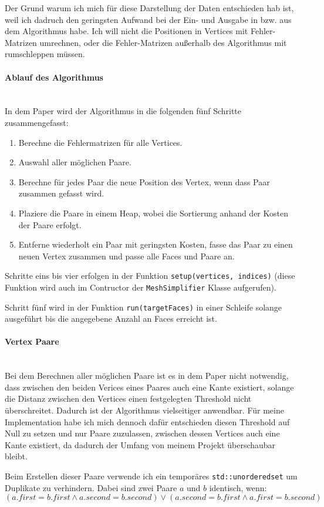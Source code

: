\documentclass[a4paper,12pt]{article}
\newcommand{\myparagraph}[1]{\paragraph*{#1}\mbox{}\\}
\begin{document}
Der Grund warum ich mich für diese Darstellung der Daten entschieden hab ist, weil ich dadruch den geringsten Aufwand bei der Ein- und Ausgabe in bzw. aus dem Algorithmus habe. 
Ich will nicht die Positionen in Vertices mit Fehler-Matrizen umrechnen, oder die Fehler-Matrizen außerhalb des Algorithmus mit rumschleppen müssen.

\myparagraph{Ablauf des Algorithmus}
In dem Paper wird der Algorithmus in die folgenden fünf Schritte zusammengefasst:

\begin{enumerate}
	\item Berechne die Fehlermatrizen für alle Vertices.
	\item Auswahl aller möglichen Paare.
	\item Berechne für jedes Paar die neue Position des Vertex, wenn dass Paar zusammen gefasst wird.
	\item Plaziere die Paare in einem Heap, wobei die Sortierung anhand der Kosten der Paare erfolgt.
	\item Entferne wiederholt ein Paar mit geringsten Kosten, fasse das Paar zu einen neuen Vertex zusammen und passe alle Faces und Paare an.
\end{enumerate}

Schritte eins bis vier erfolgen in der Funktion \texttt{setup(vertices, indices)} (diese Funktion wird auch im Contructor der \texttt{MeshSimplifier} Klasse aufgerufen).

Schritt fünf wird in der Funktion \texttt{run(targetFaces)} in einer Schleife solange ausgeführt bis die angegebene Anzahl an Faces erreicht ist.

\myparagraph{Vertex Paare}
Bei dem Berechnen aller möglichen Paare ist es in dem Paper nicht notwendig, dass zwischen den beiden Verices eines Paares auch eine Kante existiert, solange die Distanz zwischen den Vertices einen festgelegten Threshold nicht überschreitet. 
Dadurch ist der Algorithmus vielseitiger anwendbar.
Für meine Implementation habe ich mich dennoch dafür entschieden diesen Threshold auf Null zu setzen und nur Paare zuzulassen, zwischen dessen Vertices auch eine Kante existiert, da dadurch der Umfang von meinem Projekt überschaubar bleibt.

Beim Erstellen dieser Paare verwende ich ein temporäres \texttt{std::unordered\textunderscore set} um Duplikate zu verhindern.
Dabei sind zwei Paare $a$ und $b$ identisch, wenn:
$$(a.first=b.first \land a.second=b.second) \lor (a.second=b.first \land a.first=b.second)$$
\end{document}
